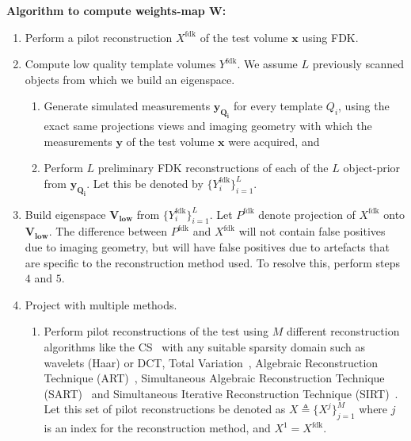 \documentclass[journal]{IEEEtran}
\begin{document}
\textbf{Algorithm to compute weights-map $\boldsymbol{W}$:}
\label{sec:thealgo}
\begin{enumerate}

\item Perform a pilot reconstruction $X^{\text{fdk}}$ of the
  test volume $\boldsymbol{x}$ using FDK.

\item Compute low quality template volumes $Y^\text{fdk}$. 
We assume $L$ previously scanned objects from which we build
an eigenspace. 
\vspace{-0.1cm}

\begin{enumerate}
  \item Generate simulated measurements $\boldsymbol{y_{Q_i}}$ for
    every template $Q_i$, using the exact same projections views and
    imaging geometry with which the measurements $\boldsymbol{y}$ of
    the test volume $\boldsymbol{x}$ were acquired, and
\item Perform $L$ preliminary FDK reconstructions of each of the $L$
  object-prior from $\boldsymbol{y_{Q_i}}$.  Let this be denoted by
  $\{Y^{\text{fdk}}_i\}_{i=1}^L$.
  \end{enumerate}
\item Build eigenspace $\boldsymbol{V_{\text{low}}}$ from
  $\{Y^{\text{fdk}}_i\}_{i=1}^L$.  Let $P^{\text{fdk}}$ denote
  projection of $X^{\text{fdk}}$ onto
  $\boldsymbol{V_{\text{low}}}$. The difference between
  $P^{\text{fdk}}$ and $X^{\text{fdk}}$ will not contain false
  positives due to imaging geometry, but will have false positives due
  to artefacts that are specific to the reconstruction method used. To
  resolve this, perform steps $4$ and $5$.
\item Project with multiple methods.
  \begin{enumerate}
  \item Perform pilot reconstructions of the test using $M$ different
    reconstruction algorithms like the CS~\cite{lasso} with any
    suitable sparsity domain such as wavelets (Haar) or  DCT, Total
    Variation~\cite{TV}, Algebraic Reconstruction Technique
    (ART)~\cite{art}, Simultaneous Algebraic Reconstruction Technique
    (SART)~\cite{sart} and Simultaneous Iterative Reconstruction
    Technique (SIRT)~\cite{sirt}. Let this set of pilot
    reconstructions be denoted as $X \triangleq \{X^j\}_{j=1}^M$ where
    $j$ is an index for the reconstruction method, and $X^1 =
    X^{\text{fdk}}$.


\end{enumerate}
\end{enumerate}
\end{document}
